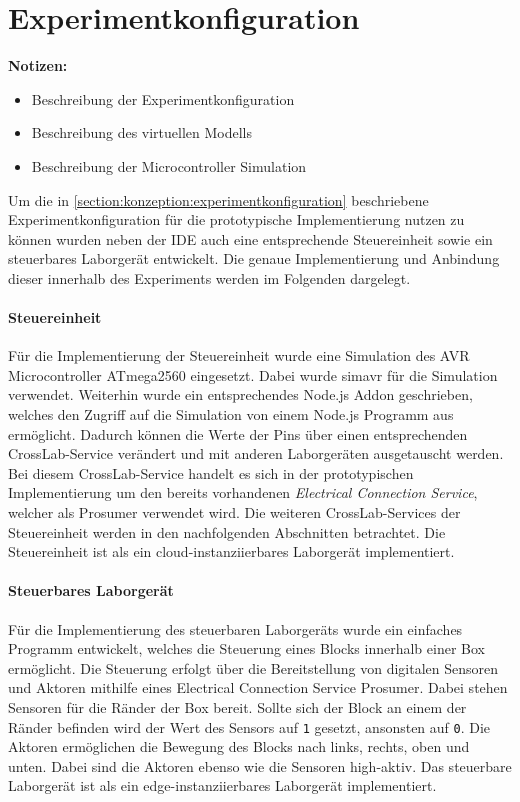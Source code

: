 \section{Experimentkonfiguration}\label{section:prototypische-implementierung:experimentkonfiguration}

\begin{note}
    \textbf{Notizen:}
    \begin{itemize}
        \item Beschreibung der Experimentkonfiguration
        \item Beschreibung des virtuellen Modells
        \item Beschreibung der Microcontroller Simulation
    \end{itemize}
\end{note}

Um die in \autoref{section:konzeption:experimentkonfiguration} beschriebene Experimentkonfiguration für die prototypische Implementierung nutzen zu können wurden neben der IDE auch eine entsprechende Steuereinheit sowie ein steuerbares Laborgerät entwickelt. Die genaue Implementierung und Anbindung dieser innerhalb des Experiments werden im Folgenden dargelegt.

\paragraph{Steuereinheit}
Für die Implementierung der Steuereinheit wurde eine Simulation des AVR Microcontroller ATmega2560 \cite{noauthor_atmega2560_nodate} eingesetzt. Dabei wurde simavr \cite{pollet_simavr_2025} für die Simulation verwendet. Weiterhin wurde ein entsprechendes Node.js Addon geschrieben, welches den Zugriff auf die Simulation von einem Node.js Programm aus ermöglicht. Dadurch können die Werte der Pins über einen entsprechenden CrossLab-Service verändert und mit anderen Laborgeräten ausgetauscht werden. Bei diesem CrossLab-Service handelt es sich in der prototypischen Implementierung um den bereits vorhandenen \textit{Electrical Connection Service}, welcher als Prosumer verwendet wird. Die weiteren CrossLab-Services der Steuereinheit werden in den nachfolgenden Abschnitten betrachtet. Die Steuereinheit ist als ein cloud-instanziierbares Laborgerät implementiert.

\paragraph{Steuerbares Laborgerät}
Für die Implementierung des steuerbaren Laborgeräts wurde ein einfaches Programm entwickelt, welches die Steuerung eines Blocks innerhalb einer Box ermöglicht. Die Steuerung erfolgt über die Bereitstellung von digitalen Sensoren und Aktoren mithilfe eines Electrical Connection Service Prosumer. Dabei stehen Sensoren für die Ränder der Box bereit. Sollte sich der Block an einem der Ränder befinden wird der Wert des Sensors auf \texttt{1} gesetzt, ansonsten auf \texttt{0}. Die Aktoren ermöglichen die Bewegung des Blocks nach links, rechts, oben und unten. Dabei sind die Aktoren ebenso wie die Sensoren high-aktiv. Das steuerbare Laborgerät ist als ein edge-instanziierbares Laborgerät implementiert.

